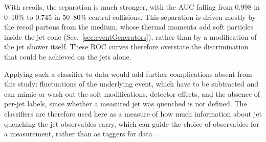 With recoils, the separation is much stronger, with the AUC falling from 0.998 in 0--10\% to 0.745 in 50--80\% central collisions.
%
This separation is driven mostly by the recoil partons from the medium, whose thermal momenta add soft particles inside the jet cone (Sec.~\ref{sec:eventGenerators}), rather than by a modification of the jet shower itself.
%
These ROC curves therefore overstate the discrimination that could be achieved on the jets alone.

Applying such a classifier to data would add further complications absent from this study: fluctuations of the underlying event, which have to be subtracted and can mimic or wash out the soft modifications, detector effects, and the absence of per-jet labels, since whether a measured jet was quenched is not defined.
%
The classifiers are therefore used here as a measure of how much information about jet quenching the jet observables carry, which can guide the choice of observables for a measurement, rather than as taggers for data~\cite{lai2022informationcontentjetquenching}.
